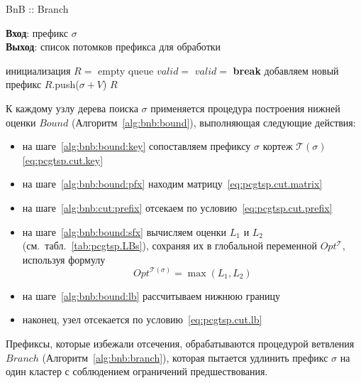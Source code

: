\begin{algorithm}
  \caption{BnB :: Branch}\label{alg:bnb:branch}
  \textbf{Вход}: префикс $\sigma$ \\
  \textbf{Выход}: список потомков префикса для обработки
  \begin{algorithmic}[1]
      \STATE инициализация $R =$ empty queue
          \STATE $valid =$ \TRUE
                  \STATE $valid =$ \FALSE
                  \STATE \textbf{break}
              \ENDIF
          \ENDFOR
              \STATE добавляем новый префикс $R$.push($\sigma+V$)
          \ENDIF
      \ENDFOR
      \RETURN $R$
  \end{algorithmic}
\end{algorithm}

К каждому узлу дерева поиска
$\sigma$
применяется процедура построения нижней оценки $Bound$
(Алгоритм~\ref{alg:bnb:bound}),
выполняющая следующие действия:
\begin{itemize}
  \item
  на шаге~\ref{alg:bnb:bound:key}
  сопоставляем префиксу $\sigma$
  кортеж $\mathcal T(\sigma) $
  \eqref{eq:pcgtsp.cut.key}
  \item
  на шаге~\ref{alg:bnb:bound:pfx}
  находим матрицу~\eqref{eq:pcgtsp.cut.matrix}
  \item
  на шаге~\ref{alg:bnb:cut:prefix}
  отсекаем по условию~\eqref{eq:pcgtsp.cut.prefix}
  \item
  на шаге~\ref{alg:bnb:bound:sfx}
  вычисляем оценки $L_1$ и $L_2$
  (см.~табл.~\ref{tab:pcgtsp.LBs}),
  сохраняя их в глобальной переменной
  $Opt^{\mathcal T}$,
  используя формулу
  $$
  Opt^{\mathcal T(\sigma)} = \max(L_1, L_2)
  $$
  \item
  на шаге~\ref{alg:bnb:bound:lb}
  рассчитываем нижнюю границу
  \item
  наконец, узел отсекается по условию~\eqref{eq:pcgtsp.cut.lb}
\end{itemize}

Префиксы,
которые избежали отсечения,
обрабатываются процедурой ветвления $Branch$
(Алгоритм~\ref{alg:bnb:branch}),
которая пытается удлинить префикс
$\sigma$
на один кластер с соблюдением ограничений предшествования.
